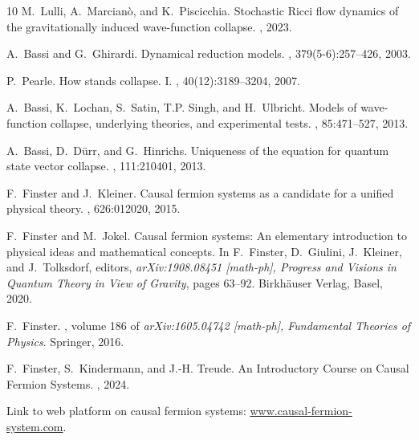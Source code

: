 \documentclass[reqno,11pt]{amsart}
\numberwithin{equation}{section}
\newcommand{\1}{\mathds{1}}
\begin{document}
{{{\begin{thebibliography}{10}
M.~Lulli, A.~Marcian{\`o}, and K.~Piscicchia.
\newblock Stochastic {R}icci flow dynamics of the gravitationally induced
  wave-function collapse.
, 2023.

A.~Bassi and G.~Ghirardi.
\newblock Dynamical reduction models.
, 379(5-6):257--426, 2003.

P.~Pearle.
\newblock How stands collapse. {I}.
, 40(12):3189--3204, 2007.

A.~Bassi, K.~Lochan, S.~Satin, T.P. Singh, and H.~Ulbricht.
\newblock Models of wave-function collapse, underlying theories, and
  experimental tests.
, 85:471--527, 2013.

A.~Bassi, D.~D\"urr, and G.~Hinrichs.
\newblock Uniqueness of the equation for quantum state vector collapse.
, 111:210401, 2013.

F.~Finster and J.~Kleiner.
\newblock Causal fermion systems as a candidate for a unified physical theory.
, 626:012020,
  2015.

F.~Finster and M.~Jokel.
\newblock Causal fermion systems: {A}n elementary introduction to physical
  ideas and mathematical concepts.
\newblock In F.~Finster, D.~Giulini, J.~Kleiner, and J.~Tolksdorf, editors,
  {\em arXiv:1908.08451 [math-ph], {P}rogress and {V}isions in {Q}uantum
  {T}heory in {V}iew of {G}ravity}, pages 63--92. Birkh\"auser Verlag, Basel,
  2020.

F.~Finster.
, volume
  186 of {\em arXiv:1605.04742 [math-ph], Fundamental Theories of Physics}.
\newblock Springer, 2016.

F.~Finster, S.~Kindermann, and J.-H. Treude.
\newblock An {I}ntroductory {C}ourse on {C}ausal {F}ermion {S}ystems.
,
  2024.

Link to web platform on causal fermion systems:
  \href{https://www.causal-fermion-system.com}{\textrm{www.causal-fermion-system.com}}.


\end{thebibliography}}}}
\end{document}
